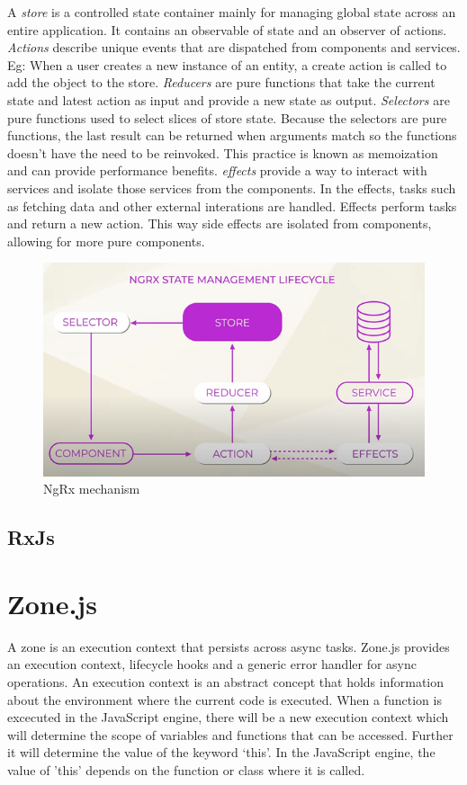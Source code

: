 A \emph{store} is a controlled state container mainly for managing global state across an entire application. It contains an observable of state and an observer of actions. \emph{Actions} describe unique events that are dispatched from components and services. Eg: When a user creates a new instance of an entity, a create action is called to add the object to the store. \emph{Reducers} are pure functions that take the current state and latest action as input and provide a new state as output. \emph{Selectors} are pure functions used to select slices of store state. Because the selectors are pure functions, the last result can be returned when arguments match so the functions doesn't have the need to be reinvoked. This practice is known as memoization and can provide performance benefits. \emph{effects} provide a way to interact with services and isolate those services from the components. In the effects, tasks such as fetching data and other external interations are handled. Effects perform tasks and return a new action. This way side effects are isolated from components, allowing for more pure components.

\autocite{AltexSoft}
\begin{figure}[h!]
	\caption{NgRx mechanism}
	\centering
	\includegraphics[width=\textwidth]{img/ngrx.png} 
\end{figure}

\subsection{RxJs}


\section{Zone.js}
A zone is an execution context that persists across async tasks. Zone.js provides an execution context, lifecycle hooks and a generic error handler for async operations. An execution context is an abstract concept that holds information about the environment where the current code is executed. When a function is excecuted in the JavaScript engine, there will be a new execution context which will determine the scope of variables and functions that can be accessed. Further it will determine the value of the keyword ‘this’. In the JavaScript engine, the value of 'this' depends on the function or class where it is called.

